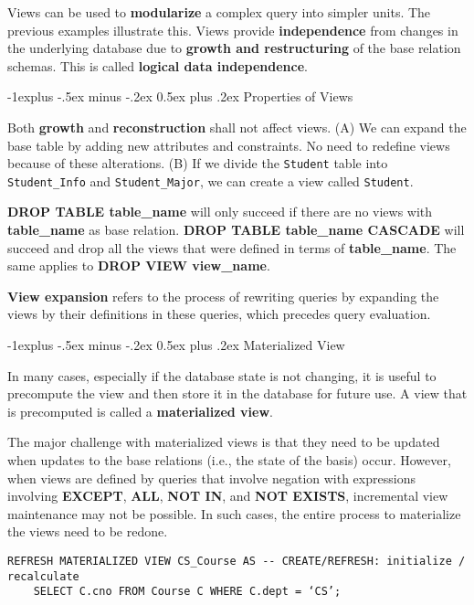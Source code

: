\documentclass[10pt,landscape]{article}
\makeatletter
\newcommand{\term}[1]{{\color{blue} \textbf{#1}}}
\newcommand{\prpt}[1]{{\color{red} \textbf{#1}}}
\newcommand{\sql}[1]{{\color{cyan} \textbf{#1}}}
\newcommand{\exmp}[1]{{\texttt{#1}}}
\renewcommand{\subsection}{\@startsection{subsection}{2}{0mm}%
                                {-1explus -.5ex minus -.2ex}%
                                {0.5ex plus .2ex}%
                                {\normalfont\normalsize\bfseries}}
\makeatother
\begin{document}
\begin{multicols}{4}
Views can be used to \prpt{modularize} a complex query into simpler units. The previous examples illustrate this. Views provide \prpt{independence} from changes in the underlying database due to \prpt{growth and restructuring} of the base relation schemas. This is called \term{logical data independence}.

\subsection{Properties of Views}

Both \prpt{growth} and \prpt{reconstruction} shall not affect views. (A) We can expand the base table by adding new attributes and constraints. No need to redefine views because of these alterations. (B) If we divide the \exmp{Student} table into \exmp{Student\_Info} and \exmp{Student\_Major}, we can create a view called \exmp{Student}.

\sql{DROP TABLE table\_name} will only succeed if there are no views with \sql{table\_name} as base relation. \sql{DROP TABLE table\_name CASCADE} will succeed and drop all the views that were defined in terms of \sql{table\_name}. The same applies to \sql{DROP VIEW view\_name}.

\term{View expansion} refers to the process of rewriting queries by expanding the views by their definitions in these queries, which precedes query evaluation.

\subsection{Materialized View}

In many cases, especially if the database state is not changing, it is useful to precompute the view and then store it in the database for future use. A view that is precomputed is called a \term{materialized view}.

The major challenge with materialized views is that they need to be updated when updates to the base relations (i.e., the state of the basis) occur. However, when views are defined by queries that involve negation with expressions involving \sql{EXCEPT}, \sql{ALL}, \sql{NOT IN}, and \sql{NOT EXISTS}, incremental view maintenance may not be possible. In such cases, the entire process to materialize the views need to be redone.

\begin{lstlisting}
REFRESH MATERIALIZED VIEW CS_Course AS -- CREATE/REFRESH: initialize / recalculate
    SELECT C.cno FROM Course C WHERE C.dept = ‘CS’;
\end{lstlisting}


\end{multicols}
\end{document}

